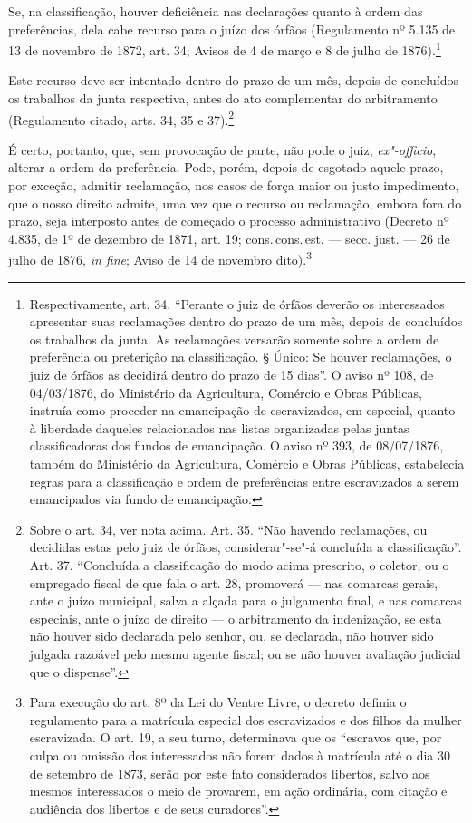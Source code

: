 Se, na classificação, houver deficiência nas declarações quanto à ordem
das preferências, dela cabe recurso para o juízo dos órfãos (Regulamento
nº 5.135 de 13 de novembro de 1872, art. 34; Avisos de 4 de março e 8 de
julho de 1876).\footnote{Respectivamente, art. 34. ``Perante o juiz de
  órfãos deverão os interessados apresentar suas reclamações dentro do
  prazo de um mês, depois de concluídos os trabalhos da junta. As
  reclamações versarão somente sobre a ordem de preferência ou
  preterição na classificação. § Único: Se houver reclamações, o juiz de
  órfãos as decidirá dentro do prazo de 15 dias''. O aviso nº 108, de
  04/03/1876, do Ministério da Agricultura, Comércio e Obras Públicas,
  instruía como proceder na emancipação de escravizados, em especial,
  quanto à liberdade daqueles relacionados nas listas organizadas pelas
  juntas classificadoras dos fundos de emancipação. O aviso nº 393, de
  08/07/1876, também do Ministério da Agricultura, Comércio e Obras
  Públicas, estabelecia regras para a classificação e ordem de
  preferências entre escravizados a serem emancipados via fundo de
  emancipação.}

Este recurso deve ser intentado dentro do prazo de um mês, depois de
concluídos os trabalhos da junta respectiva, antes do ato complementar
do arbitramento (Regulamento citado, arts. 34, 35 e 37).\footnote{
  Sobre o art. 34, ver nota acima. Art. 35. ``Não havendo reclamações, ou
  decididas estas pelo juiz de órfãos, considerar"-se"-á concluída a
  classificação''. Art. 37. ``Concluída a classificação do modo acima
  prescrito, o coletor, ou o empregado fiscal de que fala o art. 28,
  promoverá --- nas comarcas gerais, ante o juízo municipal, salva a
  alçada para o julgamento final, e nas comarcas especiais, ante o juízo
  de direito --- o arbitramento da indenização, se esta não houver sido
  declarada pelo senhor, ou, se declarada, não houver sido julgada
  razoável pelo mesmo agente fiscal; ou se não houver avaliação judicial
  que o dispense''.}

É certo, portanto, que, sem provocação de parte, não pode o juiz,
\emph{ex"-officio}, alterar a ordem da preferência. Pode, porém, depois
de esgotado aquele prazo, por exceção, admitir reclamação, nos casos de
força maior ou justo impedimento, que o nosso direito admite, uma vez
que o recurso ou reclamação, embora fora do prazo, seja interposto antes
de começado o processo administrativo (Decreto nº 4.835, de 1º de
dezembro de 1871, art. 19; cons.\,cons.\,est. --- secc. just. --- 26 de julho
de 1876, \emph{in fine}; Aviso de 14 de novembro dito).\footnote{Para
  execução do art. 8º da Lei do Ventre Livre, o decreto definia o
  regulamento para a matrícula especial dos escravizados e dos filhos da
  mulher escravizada. O art. 19, a seu turno, determinava que os
  ``escravos que, por culpa ou omissão dos interessados não forem dados à
  matrícula até o dia 30 de setembro de 1873, serão por este fato
  considerados libertos, salvo aos mesmos interessados o meio de
  provarem, em ação ordinária, com citação e audiência dos libertos e de
  seus curadores''.}

